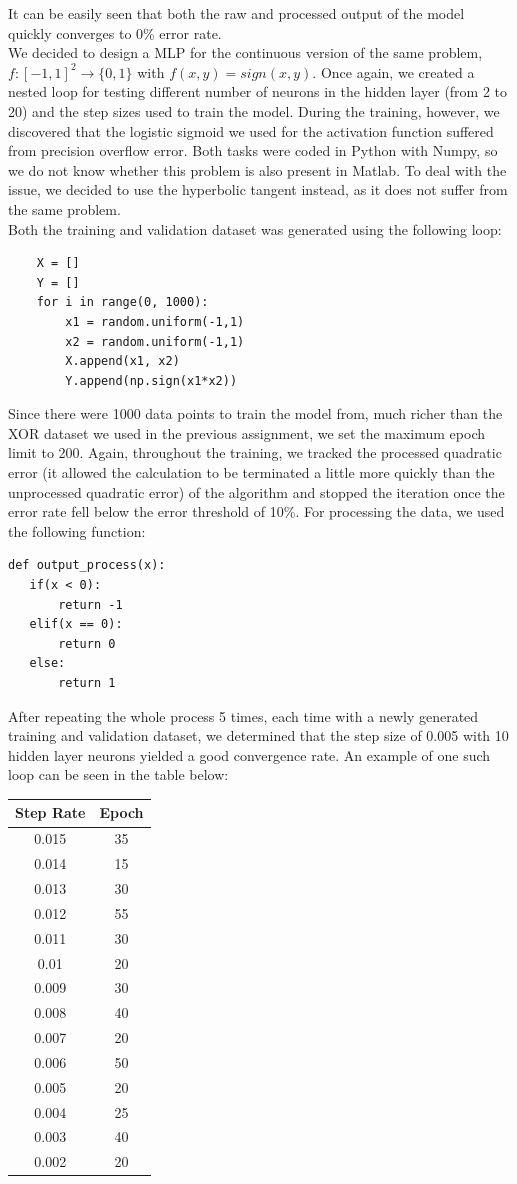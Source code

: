 \documentclass[a4paper]{article}
\begin{document}
It can be easily seen that both the raw and processed output of the model quickly converges to 0\% error rate. \\
We decided to design a MLP for the continuous version of the same problem, $f:[-1,1]^2 \rightarrow \{0,1\}$ with $f(x,y) = sign(x,y)$. Once again, we created a nested loop for testing different number of neurons in the hidden layer (from 2 to 20) and the step sizes used to train the model. During the training, however, we discovered that the logistic sigmoid we used for the activation function suffered from precision overflow error. Both tasks were coded in Python with Numpy, so we do not know whether this problem is also present in Matlab. To deal with the issue, we decided to use the hyperbolic tangent instead, as it does not suffer from the same problem. \\
Both the training and validation dataset was generated using the following loop:
\begin{lstlisting}
	X = []
	Y = []
	for i in range(0, 1000):
		x1 = random.uniform(-1,1)
		x2 = random.uniform(-1,1)
		X.append(x1, x2)
		Y.append(np.sign(x1*x2))
\end{lstlisting}
Since there were 1000 data points to train the model from, much richer than the XOR dataset we used in the previous assignment, we set the maximum epoch limit to 200. Again, throughout the training, we tracked the processed quadratic error (it allowed the calculation to be terminated a little more quickly than the unprocessed quadratic error) of the algorithm and stopped the iteration once the error rate fell below the error threshold of 10\%. For processing the data, we used the following function: \\
\begin{lstlisting}
def output_process(x):
   if(x < 0):
       return -1
   elif(x == 0):
       return 0
   else:
       return 1
\end{lstlisting}
After repeating the whole process 5 times, each time with a newly generated training and validation dataset, we determined that the step size of 0.005 with 10 hidden layer neurons yielded a good convergence rate. An example of one such loop can be seen in the table below:\\
\begin{center}
	\begin{tabular}{| c | c |}\hline
		Step Rate & Epoch \\\hline
		0.015 & 35\\
		0.014 & 15\\
		0.013 & 30\\
		0.012 & 55\\
		0.011 & 30\\
		0.01 & 20\\
		0.009 & 30\\
		0.008 & 40\\
		0.007 & 20\\
		0.006 & 50\\
		0.005 & 20\\
		0.004 & 25\\
		0.003 & 40\\
		0.002 & 20\\\hline
	\end{tabular}
\end{center}
\end{document}
